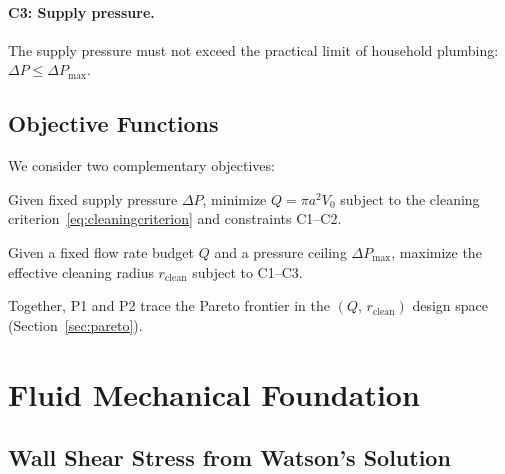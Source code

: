 \documentclass[aps,prfluids,reprint,amsmath,amssymb,floatfix]{revtex4-2}
\begin{document}
\paragraph{C3: Supply pressure.}
The supply pressure must not exceed the practical limit of household
plumbing: $\Delta P \leq \Delta P_\mathrm{max}$.

\subsection{Objective Functions}
\label{subsec:objective}

We consider two complementary objectives:

\begin{description}[leftmargin=*, itemsep=2pt]
  \item[P1 (Water minimization, fixed $\Delta P$):]
    Given fixed supply pressure $\Delta P$, minimize $Q = \pi a^2 V_0$
    subject to the cleaning criterion~\eqref{eq:cleaningcriterion}
    and constraints C1--C2.
  \item[P2 (Coverage maximization, fixed $Q$):]
    Given a fixed flow rate budget $Q$ and a pressure ceiling
    $\Delta P_\mathrm{max}$, maximize the effective cleaning radius
    $r_\mathrm{clean}$ subject to C1--C3.
\end{description}

Together, P1 and P2 trace the Pareto frontier in the
$(Q,\,r_\mathrm{clean})$ design space (Section~\ref{sec:pareto}).

\section{Fluid Mechanical Foundation}
\label{sec:watson}

\subsection{Wall Shear Stress from Watson's Solution}
\label{subsec:tauwall}
\end{document}
